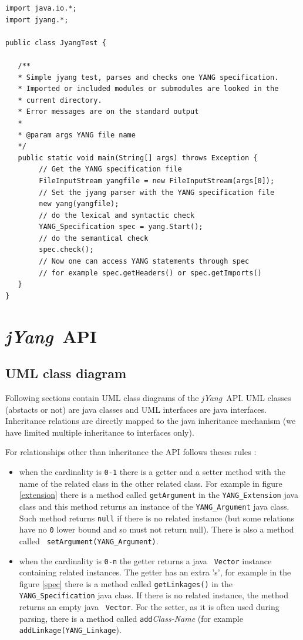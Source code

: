 \documentclass[a4paper]{article}
\newcommand{\jyang}{{\sl jYang}}
\begin{document}
\begin{lstlisting}
import java.io.*;
import jyang.*;

public class JyangTest {

   /**
   * Simple jyang test, parses and checks one YANG specification.
   * Imported or included modules or submodules are looked in the 
   * current directory.
   * Error messages are on the standard output
   * 
   * @param args YANG file name
   */
   public static void main(String[] args) throws Exception {
        // Get the YANG specification file
        FileInputStream yangfile = new FileInputStream(args[0]);
        // Set the jyang parser with the YANG specification file
        new yang(yangfile);
        // do the lexical and syntactic check
        YANG_Specification spec = yang.Start();
        // do the semantical check
        spec.check();
        // Now one can access YANG statements through spec
        // for example spec.getHeaders() or spec.getImports()
   }
}
\end{lstlisting}

\section{\jyang\ API}
\label{api}

\subsection{UML class diagram}

Following sections  contain UML class  diagrams of the \jyang\  API. UML
classes (abstacts or not) are java classes and UML interfaces are java
interfaces.  Inheritance   relations  are  directly   mapped  to the java
inheritance  mechanism  (we   have  limited  multiple  inheritance  to
interfaces only).

For relationships other than inheritance the API follows theses rules :
\begin{itemize}
\item
when  the cardinality  is {\tt  0-1} there  is a  getter and  a setter
method  with  the name  of  the related  class  in  the other  related
class. For example in figure  \ref{extension} there is a method called
{\tt  getArgument} in the  {\tt YANG\_Extension}  java class  and this
method  returns   an  instance   of  the  {\tt   YANG\_Argument}  java
class. Such method returns {\tt  null} if there is no related instance
(but some relations have no {\tt 0} lower bound and so must not return
null).      There     is     also     a     method     called     {\tt
setArgument(YANG\_Argument)}.
\item
when  the cardinality  is {\tt  0-n} the  getter returns  a  java {\tt
Vector} instance containing related instances. The getter has an extra
's', for  example in  the figure \ref{spec}  there is a  method called
{\tt getLinkages()}  in the  {\tt YANG\_Specification} java  class. If
there is  no related instance, the  method returns an  empty java {\tt
Vector}. For the setter, as it  is often used during parsing, there is
a  method   called  {\tt   add}{\sl  Class-Name}  (for   example  {\tt
addLinkage(YANG\_Linkage}).
\end{itemize}
 
\end{document}
